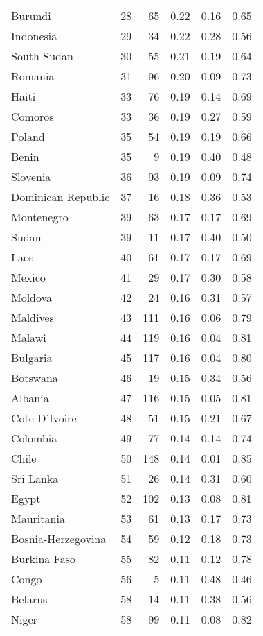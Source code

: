 \begin{longtable}[t]{lrrrrr}
Burundi & 28 & 65 & 0.22 & 0.16 & 0.65\\
Indonesia & 29 & 34 & 0.22 & 0.28 & 0.56\\
South Sudan & 30 & 55 & 0.21 & 0.19 & 0.64\\
\addlinespace
Romania & 31 & 96 & 0.20 & 0.09 & 0.73\\
Haiti & 33 & 76 & 0.19 & 0.14 & 0.69\\
Comoros & 33 & 36 & 0.19 & 0.27 & 0.59\\
Poland & 35 & 54 & 0.19 & 0.19 & 0.66\\
Benin & 35 & 9 & 0.19 & 0.40 & 0.48\\
\addlinespace
Slovenia & 36 & 93 & 0.19 & 0.09 & 0.74\\
Dominican Republic & 37 & 16 & 0.18 & 0.36 & 0.53\\
Montenegro & 39 & 63 & 0.17 & 0.17 & 0.69\\
Sudan & 39 & 11 & 0.17 & 0.40 & 0.50\\
Laos & 40 & 61 & 0.17 & 0.17 & 0.69\\
\addlinespace
Mexico & 41 & 29 & 0.17 & 0.30 & 0.58\\
Moldova & 42 & 24 & 0.16 & 0.31 & 0.57\\
Maldives & 43 & 111 & 0.16 & 0.06 & 0.79\\
Malawi & 44 & 119 & 0.16 & 0.04 & 0.81\\
Bulgaria & 45 & 117 & 0.16 & 0.04 & 0.80\\
\addlinespace
Botswana & 46 & 19 & 0.15 & 0.34 & 0.56\\
Albania & 47 & 116 & 0.15 & 0.05 & 0.81\\
Cote D'Ivoire & 48 & 51 & 0.15 & 0.21 & 0.67\\
Colombia & 49 & 77 & 0.14 & 0.14 & 0.74\\
Chile & 50 & 148 & 0.14 & 0.01 & 0.85\\
\addlinespace
Sri Lanka & 51 & 26 & 0.14 & 0.31 & 0.60\\
Egypt & 52 & 102 & 0.13 & 0.08 & 0.81\\
Mauritania & 53 & 61 & 0.13 & 0.17 & 0.73\\
Bosnia-Herzegovina & 54 & 59 & 0.12 & 0.18 & 0.73\\
Burkina Faso & 55 & 82 & 0.11 & 0.12 & 0.78\\
\addlinespace
Congo & 56 & 5 & 0.11 & 0.48 & 0.46\\
Belarus & 58 & 14 & 0.11 & 0.38 & 0.56\\
Niger & 58 & 99 & 0.11 & 0.08 & 0.82\\

\end{longtable}
